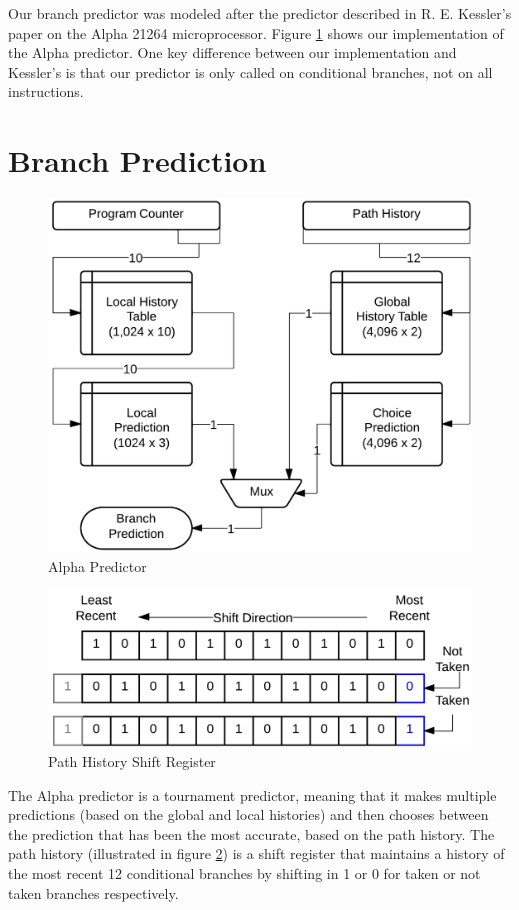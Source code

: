 \documentclass[twocolumn]{article}
\newcommand{\centerimage}[3]{
\begin{figure}[ht!]  
\begin{center} #1
\caption{#2}
\label{#3}
\end{center}
\end{figure}}
\begin{document}
Our branch predictor was modeled after the predictor described in R. E. Kessler's paper on the Alpha 21264 microprocessor.  Figure \ref{alpha} shows our implementation of the Alpha predictor.  One key difference between our implementation and Kessler's is that our predictor is only called on conditional branches, not on all instructions.\\\section{Branch Prediction}\centerimage{\includegraphics[width=\columnwidth]{img/alpha.png}}{Alpha Predictor}{alpha}\centerimage{\includegraphics[width=\columnwidth]{img/phistory.png}}{Path History Shift Register}{phistory}
The Alpha predictor is a tournament predictor, meaning that it makes multiple predictions (based on the global and local histories) and then chooses between the prediction that has  been the most accurate, based on the path history.  The path history (illustrated in figure \ref{phistory}) is a shift register that maintains a history of the most recent 12 conditional branches by shifting in 1 or 0 for taken or not taken branches respectively.\\\\
\end{document}
